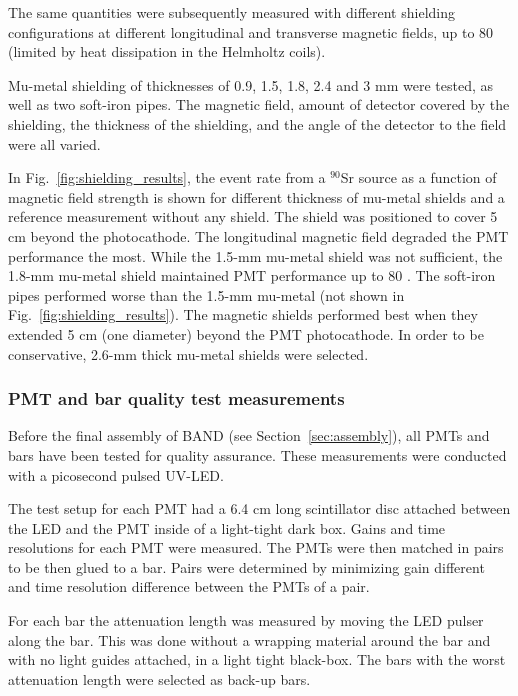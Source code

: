 \documentclass[review,number,sort&compress]{elsarticle}
\begin{document}
  The same quantities were subsequently measured with different
  shielding configurations at different longitudinal and transverse
  magnetic fields, up to 80 \si{\gauss} (limited by heat dissipation in the
  Helmholtz coils).

 Mu-metal shielding of thicknesses of 0.9, 1.5, 1.8,
  2.4 and 3 \si{\milli\meter} were tested, as well as two soft-iron pipes. The magnetic field, amount of detector covered by the
  shielding, the thickness of the shielding, and the angle of the detector to the field were
  all varied.
  
In Fig.~\ref{fig:shielding_results}, the event rate from a $^{90}$Sr source as a function of magnetic field strength is shown for different thickness of mu-metal shields and a reference measurement without any shield. The shield was positioned to cover 5 \si{\centi\meter} beyond the photocathode. 
The longitudinal magnetic field degraded the PMT performance
the most.  While the 1.5-\si{\milli\meter} mu-metal shield was not
sufficient, the 1.8-\si{\milli\meter} mu-metal shield maintained PMT
performance up to 80 \si{\gauss}.  The soft-iron pipes performed worse than the
1.5-\si{\milli\meter} mu-metal (not shown in Fig.~\ref{fig:shielding_results}). The magnetic shields performed best when they
extended 5 \si{\centi\meter} (one diameter) beyond the PMT photocathode.  In order to
be conservative, 2.6-\si{\milli\meter} thick mu-metal shields were selected.


\subsubsection{PMT and bar quality test measurements}
Before the final assembly of BAND (see Section~\ref{sec:assembly}), all PMTs and bars have been tested for quality assurance. These measurements were conducted with a picosecond pulsed UV-LED.

The test setup for each PMT had a 6.4 \si{\centi\meter} long scintillator disc attached between the LED and the PMT inside of a light-tight dark box. Gains and time resolutions for each PMT were measured. The PMTs were then matched in pairs to be then glued to a bar. Pairs were determined by minimizing gain different and time resolution difference between the PMTs of a pair.

For each bar the attenuation length was measured by moving the LED pulser along the bar. This was done without a wrapping material around the bar and with no light guides attached, in a light tight black-box. The bars with the worst attenuation length were selected as back-up bars.
\end{document}
